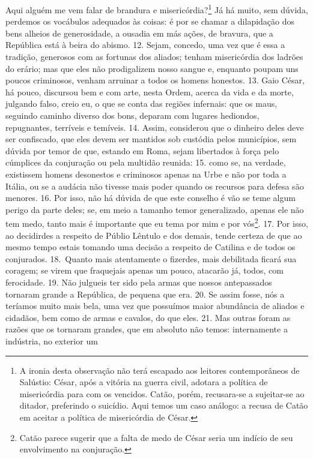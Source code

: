 Aqui alguém me vem falar de brandura e misericórdia?\footnote{A ironia desta
observação não terá escapado aos leitores contemporâneos de Salústio: César,
após a vitória na guerra civil, adotara a política de misericórdia para com os
vencidos. Catão, porém, recusara-se a sujeitar-se ao ditador, preferindo o
suicídio. Aqui temos um caso análogo: a recusa de Catão em aceitar a política
de misericórdia de César.} Já há muito, sem dúvida, perdemos os vocábulos
adequados às coisas: é por se chamar a dilapidação dos bens alheios de
generosidade, a ousadia em más ações, de bravura, que a República está à beira
do abismo. 12. Sejam, concedo, uma vez que é essa a tradição, generosos com as
fortunas dos aliados; tenham misericórdia dos ladrões do erário; mas que eles
não prodigalizem nosso sangue e, enquanto poupam uns poucos criminosos, venham
arruinar a todos os homens honestos. 13. Gaio César, há pouco, discursou bem e
com arte, nesta Ordem, acerca da vida e
da morte, julgando falso, creio eu, o que se conta das regiões infernais: que
os maus, seguindo caminho diverso dos bons, deparam com lugares hediondos,
repugnantes, terríveis e temíveis. 14. Assim, considerou que o dinheiro deles deve
ser confiscado, que eles devem ser mantidos sob custódia pelos
municípios, sem dúvida por temor de que, estando em Roma, sejam libertados à
força pelo cúmplices da conjuração ou pela multidão reunida: 15. como se, na
verdade, existissem homens desonestos e criminosos apenas na Urbe e não por
toda a Itália, ou se a audácia não tivesse mais poder quando os recursos para
defesa são menores. 16. Por isso, não há dúvida de que este conselho é vão se
teme algum perigo da parte deles; se, em meio a tamanho temor generalizado,
apenas ele não tem medo, tanto mais é importante que eu tema por mim e por vós\footnote{Catão parece sugerir que a falta de medo de César seria um indício de seu
envolvimento na conjuração.}. 17. Por isso, ao decidirdes a respeito de Públio
Lêntulo e dos demais, tende certeza de que ao mesmo tempo estais tomando uma
decisão a respeito de Catilina e de todos os conjurados. 18.~Quanto mais
atentamente o fizerdes, mais debilitada ficará sua coragem; se virem que
fraquejais apenas um pouco, atacarão já, todos, com ferocidade. 19. Não
julgueis ter sido pela armas que nossos antepassados tornaram grande a
República, de pequena que era. 20. Se assim fosse, nós a teríamos muito mais
bela, uma vez que possuímos maior abundância de aliados e cidadãos, bem como de
armas e cavalos, do que eles. 21. Mas outras foram as razões que os tornaram
grandes, que em absoluto não temos: internamente a indústria, no exterior um
